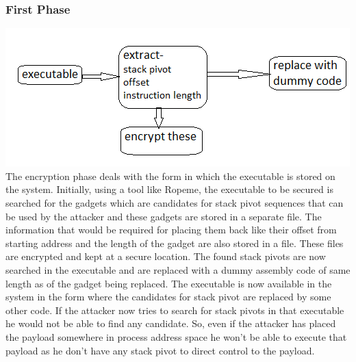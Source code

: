 \documentclass{article}
\begin{document}
\begin{multicols}{2}
	\subsubsection{First Phase}
	\includegraphics[scale=.5]{phase1.png}
	The encryption phase deals with the form in which the executable is stored on the system. Initially, using a tool like Ropeme\cite{ropeme}, the executable to be secured is searched for the gadgets which are candidates for stack pivot sequences that can be used by the attacker and these gadgets are stored in a separate file. The information that would be required for placing them back like their offset from starting address and the length of the gadget are also stored in a file. These files are encrypted and kept at a secure location. The found stack pivots are now searched in the executable and are replaced with a dummy assembly code of same length as of the gadget being replaced. The executable is now available in the system in the form where the candidates for stack pivot are replaced by some other code. If the attacker now tries to search for stack pivots in that executable he would not be able to find any candidate. So, even if the attacker has placed the payload somewhere in process address space he won't be able to execute that payload as he don't have any stack pivot to direct control to the payload.
	

\end{multicols}
\end{document}
